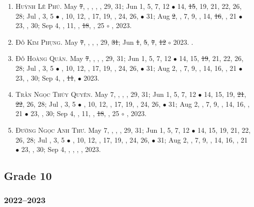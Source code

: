 \documentclass{article}
\begin{document}
\begin{enumerate}
	\item \textsc{Huỳnh Lê Phú.} May \st{7}, , , , , 29, 31; Jun 1, 5, 7, 12 $\bullet$ 14, \st{15}, 19, 21, 22, 26, 28; Jul , 3, 5 $\bullet$ , 10, 12, , 17, 19, , 24, 26,  $\bullet$ 31; Aug \st{2}, , 7, 9, , 14, \st{16}, , 21 $\bullet$ 23, , 30; Sep 4, , 11, , \st{18}, , 25 $\circ$ , 2023.
	\item \textsc{Đỗ Kim Phụng.} May \st{7}, , , , 29, \st{31}; Jun \st{1}, \st{5}, \st{7}, \st{12} $\circ$ 2023. {}. {\sf[Out]}
	\item \textsc{Đỗ Hoàng Quân.} May \st{7}, , , , 29, 31; Jun 1, 5, 7, 12 $\bullet$ 14, 15, \st{19}, 21, 22, 26, 28; Jul , 3, 5 $\bullet$ , 10, 12, , 17, 19, , 24, 26,  $\bullet$ 31; Aug 2, , 7, 9, , 14, 16, , 21 $\bullet$ 23, , 30; Sep 4, , \st{11},  $\bullet$ 2023. {\sf[Out]}
	\item \textsc{Trần Ngọc Thúy Quyên.} May 7, , , , 29, 31; Jun 1, 5, 7, 12 $\bullet$ 14, 15, 19, \st{21}, \st{22}, 26, 28; Jul , 3, 5 $\bullet$ , 10, 12, , 17, 19, , 24, 26,  $\bullet$ 31; Aug 2, , 7, 9, , 14, 16, , 21 $\bullet$ 23, , 30; Sep 4, , 11, , \st{18}, , 25 $\circ$ , 2023.
	\item \textsc{Đường Ngọc Anh Thư.} May 7, , , , 29, 31; Jun 1, 5, 7, 12 $\bullet$ 14, 15, 19, 21, 22, 26, 28; Jul , 3, 5 $\bullet$ , 10, 12, , 17, 19, , 24, 26,  $\bullet$ 31; Aug 2, , 7, 9, , 14, 16, , 21 $\bullet$ 23, , 30; Sep 4, , , , , 2023.
\end{enumerate}


\subsection{Grade 10}

\subsubsection{2022--2023}
\end{document}
